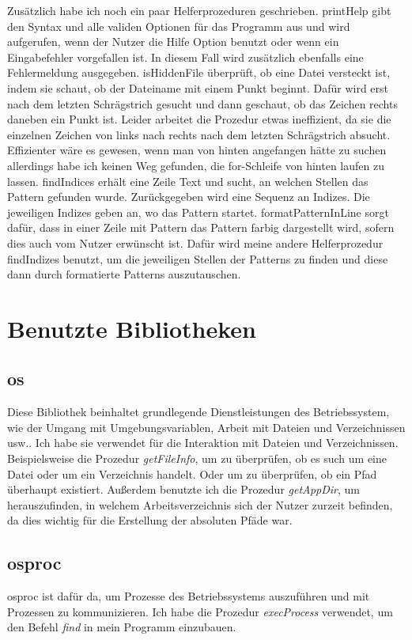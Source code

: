 \documentclass[11pt]{report}
\begin{document}
Zusätzlich habe ich noch ein paar Helferprozeduren geschrieben.
\newline
printHelp gibt den Syntax und alle validen Optionen für das Programm aus und wird aufgerufen, wenn der Nutzer die Hilfe Option benutzt oder wenn ein Eingabefehler vorgefallen ist. In diesem Fall wird zusätzlich ebenfalls eine Fehlermeldung ausgegeben.
\newline
isHiddenFile überprüft, ob eine Datei versteckt ist, indem sie schaut, ob der Dateiname mit einem Punkt beginnt. Dafür wird erst nach dem letzten Schrägstrich gesucht und dann geschaut, ob das Zeichen rechts daneben ein Punkt ist. Leider arbeitet die Prozedur etwas ineffizient, da sie die einzelnen Zeichen von links nach rechts nach dem letzten Schrägstrich absucht. Effizienter wäre es gewesen, wenn man von hinten angefangen hätte zu suchen allerdings habe ich keinen Weg gefunden, die for-Schleife von hinten laufen zu lassen.
\newline
findIndices erhält eine Zeile Text und sucht, an welchen Stellen das Pattern gefunden wurde. Zurückgegeben wird eine Sequenz an Indizes. Die jeweiligen Indizes geben an, wo das Pattern startet.
\newline
formatPatternInLine sorgt dafür, dass in einer Zeile mit Pattern das Pattern farbig dargestellt wird, sofern dies auch vom Nutzer erwünscht ist. Dafür wird meine andere Helferprozedur findIndizes benutzt, um die jeweiligen Stellen der Patterns zu finden und diese dann durch formatierte Patterns auszutauschen.


\section{Benutzte Bibliotheken}
\subsection{os}
Diese Bibliothek beinhaltet grundlegende Dienstleistungen des Betriebssystem, wie der Umgang mit Umgebungsvariablen, Arbeit mit Dateien und Verzeichnissen usw..
Ich habe sie verwendet für die Interaktion mit Dateien und Verzeichnissen. Beispielsweise die Prozedur \emph{getFileInfo}, um zu überprüfen, ob es such um eine Datei oder um ein Verzeichnis handelt. Oder um zu überprüfen, ob ein Pfad überhaupt existiert. Außerdem benutzte ich die Prozedur \emph{getAppDir}, um herauszufinden, in welchem Arbeitsverzeichnis sich der Nutzer zurzeit befinden, da dies wichtig für die Erstellung der absoluten Pfäde war.
\subsection{osproc}
osproc ist dafür da, um Prozesse des Betriebssystems auszuführen und mit Prozessen zu kommunizieren.
Ich habe die Prozedur \emph{execProcess} verwendet, um den Befehl \emph{find} in mein Programm einzubauen.
\end{document}
